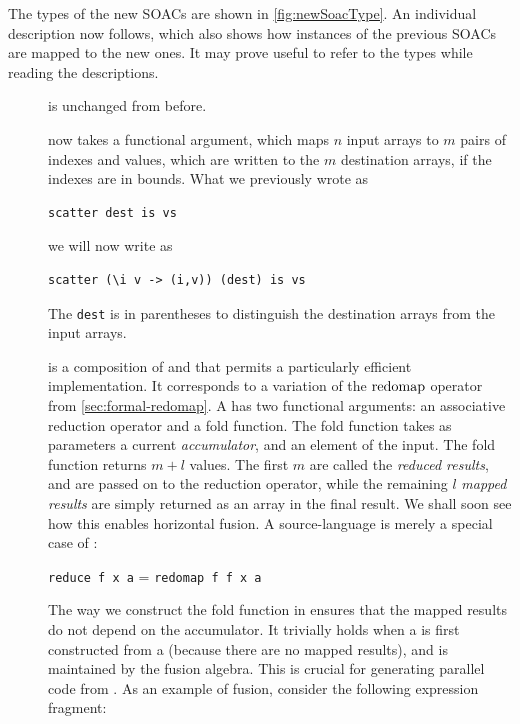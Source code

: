 The types of the new SOACs are shown in \cref{fig:newSoacType}.  An
individual description now follows, which also shows how instances of
the previous SOACs are mapped to the new ones.  It may prove useful to
refer to the types while reading the descriptions.

\begin{description}
\item[{}] is unchanged from before.
\item[{}] now takes a functional argument, which maps $n$
  input arrays to $m$ pairs of indexes and values, which are written
  to the $m$ destination arrays, if the indexes are in bounds.
  What we previously wrote as
\begin{lstlisting}
scatter dest is vs
\end{lstlisting}
we will now write as
\begin{lstlisting}
scatter (\i v -> (i,v)) (dest) is vs
\end{lstlisting}
  The \lstinline{dest} is in parentheses to distinguish the
  destination arrays from the input arrays.
\item[] is a composition of  and  that
  permits a particularly efficient implementation.  It corresponds to
  a variation of the $\mathrm{redomap}$ operator from
  \cref{sec:formal-redomap}.  A  has two functional
  arguments: an associative reduction operator and a fold function.
  The fold function takes as parameters a current
  \textit{accumulator}, and an element of the input.  The 
  fold function returns $m+l$ values.  The first $m$ are called the
  \textit{reduced results}, and are passed on to the reduction
  operator, while the remaining $l$ \textit{mapped results} are simply
  returned as an array in the final result.  We shall soon see how
  this enables horizontal fusion.  A source-language  is merely a special case of :\\
  \centerline{\lstinline{reduce f x a} = \lstinline{redomap f f x a}}
  The way we construct the fold function in  ensures that
  the mapped results do not depend on the accumulator.  It trivially
  holds when a  is first constructed from a 
  (because there are no mapped results), and is maintained by the
  fusion algebra.  This is crucial for generating parallel code from
  .  As an example of  fusion, consider the
  following expression fragment:
\begin{lstlisting}

\end{lstlisting}
\end{description}
